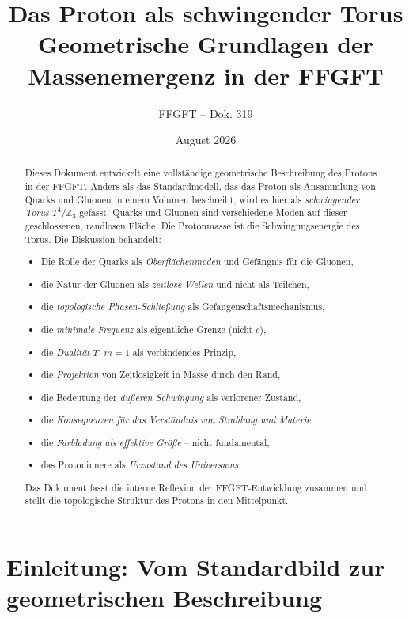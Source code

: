 \documentclass[11pt,a4paper]{article}
\title{Das Proton als schwingender Torus\\
	\large Geometrische Grundlagen der Massenemergenz in der FFGFT}
\author{FFGFT -- Dok. 319}
\date{August 2026}
\begin{document}
	
	\maketitle
	
	\begin{abstract}
		Dieses Dokument entwickelt eine vollständige geometrische Beschreibung des Protons in der FFGFT. 
		Anders als das Standardmodell, das das Proton als Ansammlung von Quarks und Gluonen in einem Volumen beschreibt, 
		wird es hier als \emph{schwingender Torus} \(T^4/\mathbb{Z}_3\) gefasst. 
		Quarks und Gluonen sind verschiedene Moden auf dieser geschlossenen, randlosen Fläche. 
		Die Protonmasse ist die Schwingungsenergie des Torus. 
		Die Diskussion behandelt:
		\begin{itemize}
			\item Die Rolle der Quarks als \emph{Oberflächenmoden} und Gefängnis für die Gluonen,
			\item die Natur der Gluonen als \emph{zeitlose Wellen} und nicht als Teilchen,
			\item die \emph{topologische Phasen-Schließung} als Gefangenschaftsmechanismus,
			\item die \emph{minimale Frequenz} als eigentliche Grenze (nicht \(c\)),
			\item die \emph{Dualität} \(\tilde{T}\cdot m = 1\) als verbindendes Prinzip,
			\item die \emph{Projektion} von Zeitlosigkeit in Masse durch den Rand,
			\item die Bedeutung der \emph{äußeren Schwingung} als verlorener Zustand,
			\item die \emph{Konsequenzen für das Verständnis von Strahlung und Materie},
			\item die \emph{Farbladung als effektive Größe} -- nicht fundamental,
			\item das Protoninnere als \emph{Urzustand des Universums}.
		\end{itemize}
		Das Dokument fasst die interne Reflexion der FFGFT-Entwicklung zusammen und stellt die topologische Struktur des Protons in den Mittelpunkt.
	\end{abstract}
	
	\tableofcontents
	
	\section{Einleitung: Vom Standardbild zur geometrischen Beschreibung}
	
\end{document}
